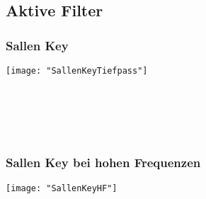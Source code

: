 

\subsection{Aktive Filter}
\subsubsection{Sallen Key}
\begin{minipage}[t]{0.3\textwidth}
	\vspace{0pt}
	\texttt{[image: "SallenKeyTiefpass"]}
\end{minipage}\hspace{0.05\textwidth}
\begin{minipage}[t]{0.3\textwidth}
	\vspace{0pt}
	\\
\end{minipage}
\begin{minipage}[t]{0.3\textwidth}
	\vspace{0pt}
	\\
	\\
\end{minipage}
\vspace{2mm}



\subsubsection{Sallen Key bei hohen Frequenzen}
\begin{minipage}[t]{0.3\textwidth}
	\vspace{0pt}
	\texttt{[image: "SallenKeyHF"]}
\end{minipage}\hspace{0.05\textwidth}
\begin{minipage}[t]{0.3\textwidth}
	\vspace{0pt}
\end{minipage}
\begin{minipage}[t]{0.3\textwidth}
	\vspace{0pt}
	
\end{minipage}
\vspace{2mm}


